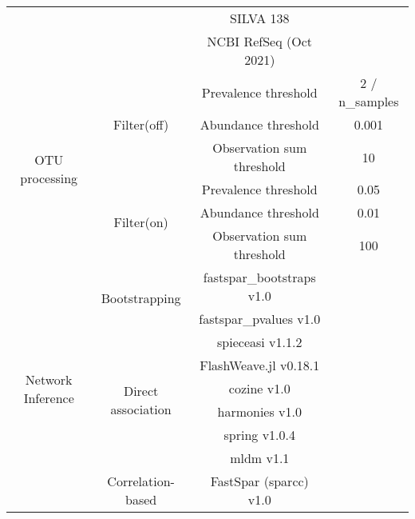 \begin{table}[H]
\begin{tabular}{|c|c|c|c|}
                                           & & SILVA 138 & \cite{Quast2012} \\
                                           & & NCBI RefSeq (Oct 2021) & \cite{Sayers2009} \\
      \hline
      \multirow{6}{*}{OTU processing} & \multirow{3}{*}{Filter(off)} & Prevalence threshold      & 2 / n\_samples \\
                                      & & Abundance threshold       & 0.001          \\
                                      & & Observation sum threshold & 10             \\ \cline{2-4}
                                      & \multirow{3}{*}{Filter(on)}  & \rowcolor{lightgray} Prevalence threshold      & 0.05           \\
                                      & & \rowcolor{lightgray} Abundance threshold       & 0.01           \\
                                      & & \rowcolor{lightgray} Observation sum threshold & 100            \\
      \hline
      \multirow{12}{*}{Network Inference} & \multirow{2}{*}{Bootstrapping}& fastspar\_bootstraps v1.0 & \cite{Watts2018} \\
                                          & & fastspar\_pvalues v1.0 & \cite{Watts2018} \\
                                          \cline{2-4}
                                          & \multirow{6}{*}{Direct association} & \ac{spieceasi} v1.1.2 & \cite{Kurtz2015} \\
                                          & & FlashWeave.jl v0.18.1 & \cite{tackmannRapidInferenceDirect2019} \\
                                          & & \ac{cozine} v1.0 & \cite{haCompositionalZeroinflatedNetwork2020a} \\
                                          & & \ac{harmonies} v1.0 & \cite{jiangHARMONIESHybridApproach2020} \\
                                          & & \ac{spring} v1.0.4 & \cite{yoonMicrobialNetworksSPRING2019} \\
                                          & & \ac{mldm} v1.1 & \cite{Yang2017} \\
                                          \cline{2-4}
                                          & \multirow{2}{*}{Correlation-based} & FastSpar (\ac{sparcc}) v1.0 & \cite{Watts2018} \\

\end{tabular}
\end{table}
